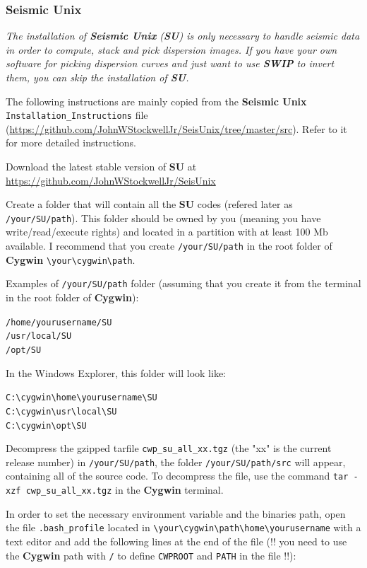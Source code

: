 \documentclass[twoside,a4paper]{article}
\def\SWIP{\textbf{SWIP}}
\def\SU{\textbf{SU}}
\def\SeismicUnix{\textbf{Seismic Unix}}
\def\Cygwin{\textbf{Cygwin}}
\begin{document}
\subsubsection{Seismic Unix}
\label{subsec:WinSU}
\textit{The installation of {\SeismicUnix} ({\SU}) is only necessary to handle seismic data in order to compute, stack and pick dispersion images. If you have your own software for picking dispersion curves and just want to use {\SWIP} to invert them, you can skip the installation of {\SU}.}

The following instructions are mainly copied from the {\SeismicUnix} \verb|Installation_Instructions| file (\url{https://github.com/JohnWStockwellJr/SeisUnix/tree/master/src}). Refer to it for more detailed instructions.

Download the latest stable version of {\SU} at \url{https://github.com/JohnWStockwellJr/SeisUnix}

Create a folder that will contain all the {\SU} codes (refered later as \verb|/your/SU/path|). This folder should be owned by you (meaning you have write/read/execute rights) and located in a partition with at least 100 Mb available. I recommend that you create \verb|/your/SU/path| in the root folder of {\Cygwin} \verb|\your\cygwin\path|.

Examples of \verb|/your/SU/path| folder (assuming that you create it from the terminal in the root folder of {\Cygwin}):

\verb|/home/yourusername/SU|\\
\verb|/usr/local/SU|\\
\verb|/opt/SU|

In the Windows Explorer, this folder will look like:

\verb|C:\cygwin\home\yourusername\SU|\\
\verb|C:\cygwin\usr\local\SU|\\
\verb|C:\cygwin\opt\SU|

Decompress the gzipped tarfile \verb|cwp_su_all_xx.tgz| (the "xx" is the current release number) in \verb|/your/SU/path|, the folder \verb|/your/SU/path/src| will appear, containing all of the source code. To decompress the file, use the command \verb|tar -xzf cwp_su_all_xx.tgz| in the {\Cygwin} terminal.

In order to set the necessary environment variable and the binaries path, open the file \verb|.bash_profile| located in \verb|\your\cygwin\path\home\yourusername| with a text editor and add the following lines at the end of the file (!! you need to use the {\Cygwin} path with \verb|/| to define \verb|CWPROOT| and \verb|PATH| in the file !!):
\end{document}
